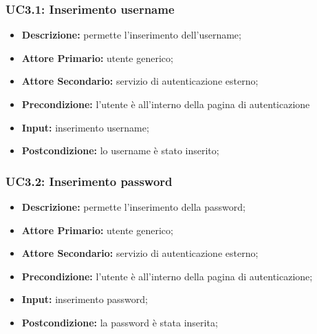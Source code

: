 \subsubsection{UC3.1: Inserimento username}
\label{sec:UC3.1}
\begin{itemize}
    \item \textbf{Descrizione:} permette l'inserimento dell'username;
    \item \textbf{Attore Primario:} utente generico;
    \item \textbf{Attore Secondario:} servizio di autenticazione esterno;
    \item \textbf{Precondizione:} l'utente è all'interno della pagina di autenticazione
    \item \textbf{Input:} inserimento username;
    \item \textbf{Postcondizione:} lo username è stato inserito;
\end{itemize}
\subsubsection{UC3.2: Inserimento password}
\label{sec:UC3.2}
\begin{itemize}
    \item \textbf{Descrizione:} permette l'inserimento della password;
    \item \textbf{Attore Primario:} utente generico;
    \item \textbf{Attore Secondario:} servizio di autenticazione esterno;
    \item \textbf{Precondizione:} l'utente è all'interno della pagina di autenticazione;
    \item \textbf{Input:} inserimento password;
    \item \textbf{Postcondizione:} la password è stata inserita;
\end{itemize}
